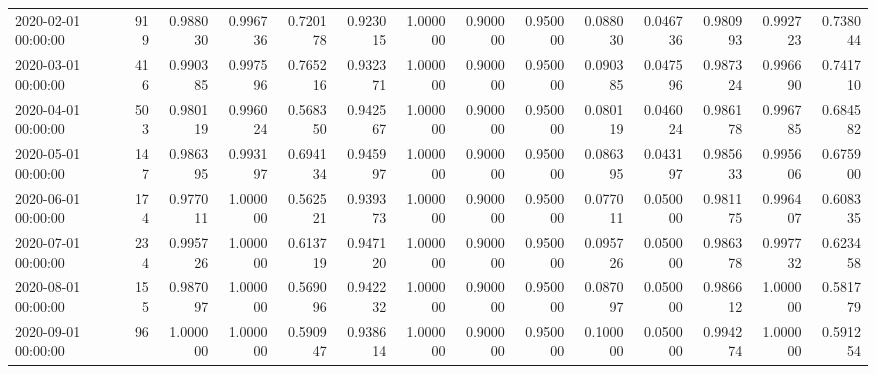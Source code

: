 \begin{tabular}{lrrrrrrrrrrrrr}
2020-02-01 00:00:00 & 919 & 0.988030 & 0.996736 & 0.720178 & 0.923015 & 1.000000 & 0.900000 & 0.950000 & 0.088030 & 0.046736 & 0.980993 & 0.992723 & 0.738044 \\
2020-03-01 00:00:00 & 416 & 0.990385 & 0.997596 & 0.765216 & 0.932371 & 1.000000 & 0.900000 & 0.950000 & 0.090385 & 0.047596 & 0.987324 & 0.996690 & 0.741710 \\
2020-04-01 00:00:00 & 503 & 0.980119 & 0.996024 & 0.568350 & 0.942567 & 1.000000 & 0.900000 & 0.950000 & 0.080119 & 0.046024 & 0.986178 & 0.996785 & 0.684582 \\
2020-05-01 00:00:00 & 147 & 0.986395 & 0.993197 & 0.694134 & 0.945997 & 1.000000 & 0.900000 & 0.950000 & 0.086395 & 0.043197 & 0.985633 & 0.995606 & 0.675900 \\
2020-06-01 00:00:00 & 174 & 0.977011 & 1.000000 & 0.562521 & 0.939373 & 1.000000 & 0.900000 & 0.950000 & 0.077011 & 0.050000 & 0.981175 & 0.996407 & 0.608335 \\
2020-07-01 00:00:00 & 234 & 0.995726 & 1.000000 & 0.613719 & 0.947120 & 1.000000 & 0.900000 & 0.950000 & 0.095726 & 0.050000 & 0.986378 & 0.997732 & 0.623458 \\
2020-08-01 00:00:00 & 155 & 0.987097 & 1.000000 & 0.569096 & 0.942232 & 1.000000 & 0.900000 & 0.950000 & 0.087097 & 0.050000 & 0.986612 & 1.000000 & 0.581779 \\
2020-09-01 00:00:00 & 96 & 1.000000 & 1.000000 & 0.590947 & 0.938614 & 1.000000 & 0.900000 & 0.950000 & 0.100000 & 0.050000 & 0.994274 & 1.000000 & 0.591254 \\
\bottomrule
\end{tabular}
